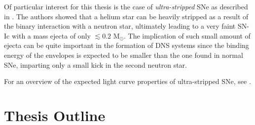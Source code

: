 \documentclass[../../main/thesis_msc.tex]{subfiles}
\begin{document}
				Of particular interest for this thesis is the case of \emph{ultra-stripped} SNe as described in \cite{Tauris_ultra, Tauris2013}. The authors showed that a helium star can be heavily stripped as a result of the binary interaction with a neutron star, ultimately leading to a very faint SN-Ic with a mass ejecta of only $\lesssim 0.2$ M$_{\odot}$. The implication of such small amount of ejecta can be quite important in the formation of DNS systems since the binding energy of the envelopes is expected to be smaller than the one found in normal SNe, imparting only a small kick in the second neutron star.
				
				For an overview of the expected light curve properties of ultra-stripped SNe, see \cite{Moriya2017}.
				
		\section{Thesis Outline}
				
				
    
\end{document}
